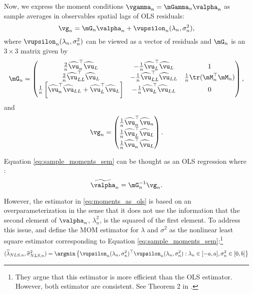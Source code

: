 Now, we express the moment conditions $\vgamma_n = \mGamma_n\valpha_n$ as sample averages in observables spatial lags of OLS residuals:
\begin{equation}\label{eq:sample_moments_sem}
  \vg_n = \mG_n\valpha_n +  \vupsilon_n(\lambda_n, \sigma^2_n),
\end{equation}
%
where $\vupsilon_n(\lambda_n, \sigma^2_n)$ can be viewed as a vector of residuals and $\mG_n$ is an $3\times 3$ matrix given by
\begin{equation}\label{eq:matrix-G-sem}
  \mG_n = \begin{pmatrix}
   \frac{2}{n}\widehat{\vu}^\top_n\widehat{\vu}_L & -\frac{1}{n}\widehat{\vu}_L^\top\widehat{\vu}_L & 1\\
   \frac{2}{n}\widehat{\vu}^\top_{LL}\widehat{\vu}_L & -\frac{1}{n}\widehat{\vu}_{LL}^\top\widehat{\vu}_{LL} & \frac{1}{n} \tr(\mM^\top_n\mM_n)\\
   \frac{1}{n}\left[\widehat{\vu}^\top_n\widehat{\vu}_{LL} + \widehat{\vu}_L^\top\widehat{\vu}_L\right] & -\frac{1}{n}\widehat{\vu}_{L}^\top\widehat{\vu}_{LL} & 0
        \end{pmatrix},
\end{equation}
%
and
\begin{equation}\label{eq:matrix-g-sem}
  \vg_n = \begin{pmatrix}
  \frac{1}{n}\widehat{\vu}^\top_n\widehat{\vu}_n \\
  \frac{1}{n}\widehat{\vu}^\top_L\widehat{\vu}_L \\
  \frac{1}{n}\widehat{\vu}^\top_n\widehat{\vu}_L
        \end{pmatrix}.
\end{equation}

Equation \eqref{eq:sample_moments_sem} can be thought as an OLS regression where \citep{kelejian1998generalized}:
\begin{equation}\label{eq:moments_as_ols}
\widetilde{\valpha}_n = \mG_n^{-1}\vg_n.
\end{equation}

However, the estimator in \eqref{eq:moments_as_ols} is based on an overparameterization in the sense that it does not use the information that the second element of $\valpha_n$, $\lambda^2_n$, is the squared of the first element. To address this issue, \cite{kelejian1998generalized} and \cite{kelejian1999generalized} define the MOM estimator for $\lambda$ and $\sigma^2$ as the nonlinear least square estimator corresponding to Equation \eqref{eq:sample_moments_sem}:\footnote{They argue that this estimator is more efficient than the OLS estimator. However, both estimator are consistent. See Theorem 2 in \citep{kelejian1998generalized}.}
\begin{equation}\label{eq:nls_estimator}
  (\widehat{\lambda}_{NLS, n}, \widehat{\sigma}^2_{NLS, n}) = \argmin \left\lbrace \vupsilon_n(\lambda_n, \sigma^2_n)^\top\vupsilon_n(\lambda_n, \sigma^2_n): \lambda_n \in [-a, a], \sigma^2_n\in [0, b]\right\rbrace 
\end{equation}


